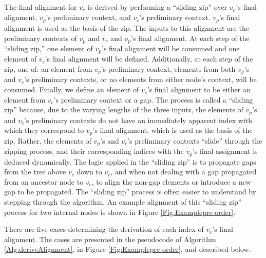 \documentclass{bmcart}
\begin{document}
The final alignment for $v_c$ is derived by performing a ``sliding zip'' over $v_p$'s final alignment, $v_p$'s preliminary context, and $v_c$'s preliminary context.
$v_p$'s final alignment is used as the basis of the zip.
The inputs to this alignment are the preliminary contexts of $v_p$ and $v_c$ and $v_p$'s final alignment.
At each step of the ``sliding zip,'' one element of $v_p$'s final alignment will be consumed and one element of $v_c$'s final alignment will be defined.
Additionally, at each step of the zip, one of: an element from $v_p$'s preliminary context, elements from both $v_p$'s and $v_c$'s preliminary contexts, or no elements from either node's context, will be consumed.
Finally, we define an element of $v_c$'s final alignment to be either an element from $v_c$'s preliminary context or a gap.
The process is called a ``sliding zip'' because, due to the varying lengths of the three inputs, the elements of $v_p$'s and $v_c$'s preliminary contexts do not have an immediately apparent index with which they correspond to $v_p$'s final alignment, which is used as the basis of the zip.
Rather, the elements of $v_p$'s and $v_c$'s preliminary contexts ``slide'' through the zipping process, and their corresponding indices with the $v_p$'s final assignment is deduced dynamically.
The logic applied in the ``sliding zip'' is to propagate gaps from the tree above $v_c$ down to $v_c$, and when not dealing with a gap propagated from an ancestor node to $v_c$, to align the non-gap elements or introduce a new gap to be propagated.
The ``sliding zip'' process is often easier to understand by stepping through the algorithm.
An example alignment of this ``sliding zip'' process for two internal nodes is shown in Figure \ref{Fig:Examplepre-order}.

There are five cases determining the derivation of each index of $v_c$'s final alignment. The cases are presented in the pseudocode of Algorithm \ref{Alg:deriveAlignment}, in Figure \ref{Fig:Examplepre-order}, and described below.
\end{document}
